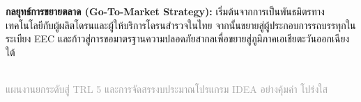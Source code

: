 \documentclass[11pt]{article}
\begin{document}
\vspace{3mm}
\begin{tcolorbox}[colback=lightbg,colframe=secondary,arc=2mm,top=3mm,bottom=3mm]
  \textbf{\textcolor{primary}{กลยุทธ์การขยายตลาด (Go-To-Market Strategy):}} เริ่มต้นจากการเป็นพันธมิตรทางเทคโนโลยีกับผู้ผลิตโดรนและผู้ให้บริการโดรนสำรวจในไทย จากนั้นขยายสู่ผู้ประกอบการรถบรรทุกในระเบียง EEC และก้าวสู่การขอมาตรฐานความปลอดภัยสากลเพื่อขยายสู่ภูมิภาคเอเชียตะวันออกเฉียงใต้
\end{tcolorbox}

\clearpage

\noindent {\Large \textbf{\textcolor{primary}{09 \textbar\ แผนการดำเนินงานและงบประมาณ (Milestones \& Budget: 150,000 บาท)}}}\\[1mm]
{\normalsize \textcolor{darkgray}{แผนงานยกระดับสู่ TRL 5 และการจัดสรรงบประมาณโปรแกรม IDEA อย่างคุ้มค่า โปร่งใส}}\\[3mm]
\end{document}
